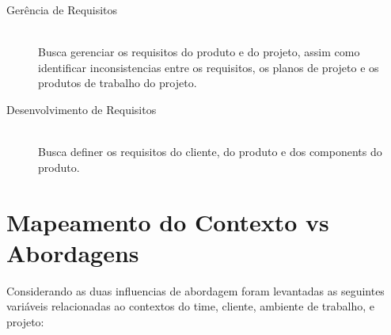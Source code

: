\begin{description}
  \item[Gerência de Requisitos] \hfill \\
  Busca gerenciar os requisitos do produto e do projeto, assim como identificar
  inconsistencias entre os requisitos, os planos de projeto e os produtos de trabalho do projeto.
  \item[Desenvolvimento de Requisitos] \hfill \\
  Busca definer os requisitos do cliente, do produto e dos components do produto.
\end{description}





\section{Mapeamento do Contexto vs Abordagens}

Considerando as duas influencias de abordagem foram levantadas as seguintes variáveis
relacionadas ao contextos do time, cliente, ambiente de trabalho, e projeto:

